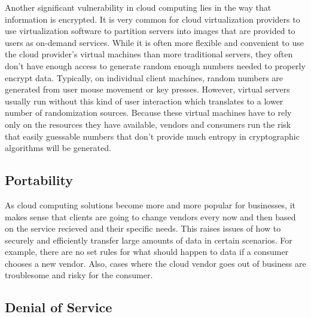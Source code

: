 \documentclass[a4paper, 8pt]{article} %
\begin{document}
\begin{doublespacing}
Another significant vulnerability in cloud computing lies in the way that information is encrypted.  It is very common for cloud virtualization providers to use virtualization software to partition servers into images that are provided to users as on-demand services.  While it is often more flexible and convenient to use the cloud provider's virtual machines than more traditional servers, they often don't have enough access to generate random enough numbers needed to properly encrypt data.  Typically, on individual client machines, random numbers are generated from user mouse movement or key presses.  However, virtual servers usually run without this kind of user interaction which translates to a lower number of randomization sources.  Because these virtual machines have to rely only on the resources they have available, vendors and consumers run the risk that easily guessable numbers that don't provide much entropy in cryptographic algorithms will be generated.  

\subsection*{Portability}

As cloud computing solutions become more and more popular for businesses, it makes sense that clients are going to change vendors every now and then based on the service recieved and their specific needs.  This raises issues of how to securely and efficiently transfer large amounts of data in certain scenarios.  For example, there are no set rules for what should happen to data if a consumer chooses a new vendor.  Also, cases where the cloud vendor goes out of business are troublesome and risky for the consumer.  

\fi %

\subsection*{Denial of Service}


\end{doublespacing}
\end{document}
